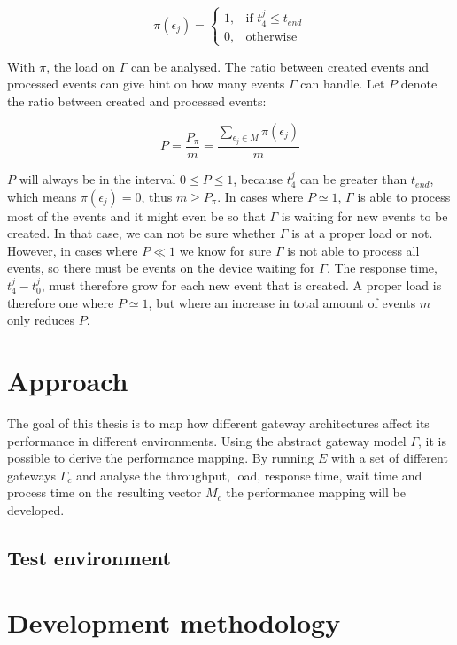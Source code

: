 \[
    \pi(\epsilon_j) =
\begin{cases}
    1, & \text{if } t_4^j \leq t_{end} \\
    0, & \text{otherwise}
\end{cases}
\]

With $\pi$, the load on $\Gamma$ can be analysed. The ratio between created
events and processed events can give hint on how many events $\Gamma$ can
handle. Let $P$ denote the ratio between created and processed events:

$$
P = \frac{P_\pi}{m} = \frac{\sum_{\epsilon_j \in M}{\pi(\epsilon_j)}}{m}
$$

$P$ will always be in the interval $0 \leq P \leq 1$, because $t_4^j$ can be
greater than $t_{end}$, which means $\pi(\epsilon_j) = 0$, thus $m \geq P_\pi$.
In cases where $P \simeq 1$, $\Gamma$ is able to process most of the events and
it might even be so that $\Gamma$ is waiting for new events to be created. In
that case, we can not be sure whether $\Gamma$ is at a proper load or not.
However, in cases where $P \ll 1$ we know for sure $\Gamma$ is not able to
process all events, so there must be events on the device waiting for $\Gamma$.
The response time, $t_4^j - t_0^j$, must therefore grow for each new event that
is created. A proper load is therefore one where $P \simeq 1$, but where an
increase in total amount of events $m$ only reduces $P$.

\section{Approach}

The goal of this thesis is to map how different gateway architectures affect
its performance in different environments. Using the abstract gateway model
$\Gamma$, it is possible to derive the performance mapping. By running $E$ with
a set of different gateways $\Gamma_c$ and analyse the throughput, load,
response time, wait time and process time on the resulting vector $M_c$ the
performance mapping will be developed.

\subsection{Test environment}

\section{Development methodology}

